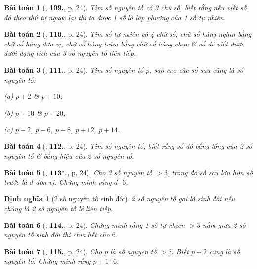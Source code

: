 \documentclass[oneside]{book}
\numberwithin{equation}{section}
\newtheorem{dinhnghia}{Định nghĩa}[section]
\newtheorem{baitoan}{Bài toán}[section]
\begin{document}
\begin{baitoan}[\cite{Binh_Toan_6_tap_1}, \textbf{109.}, p. 24]
	Tìm số nguyên tố có 3 chữ số, biết rằng nếu viết số đó theo thứ tự ngược lại thì ta được 1 số là lập phương của 1 số tự nhiên.
\end{baitoan}

\begin{baitoan}[\cite{Binh_Toan_6_tap_1}, \textbf{110.}, p. 24]
	Tìm số tự nhiên có 4 chữ số, chữ số hàng nghìn bằng chữ số hàng đơn vị, chữ số hàng trăm bằng chữ số hàng chục \& số đó viết được dưới dạng tích của 3 số nguyên tố liên tiếp.
\end{baitoan}

\begin{baitoan}[\cite{Binh_Toan_6_tap_1}, \textbf{111.}, p. 24]
	Tìm số nguyên tố $p$, sao cho các số sau cũng là số nguyên tố:
	\begin{enumerate*}
		\item[(a)] $p + 2$ \& $p + 10$;
		\item[(b)] $p + 10$ \& $p + 20$;
		\item[(c)] $p + 2$, $p + 6$, $p + 8$, $p + 12$, $p + 14$.
	\end{enumerate*}
\end{baitoan}

\begin{baitoan}[\cite{Binh_Toan_6_tap_1}, \textbf{112.}, p. 24]
	Tìm số nguyên tố, biết rằng số đó bằng tổng của 2 số nguyên tố \& bằng hiệu của 2 số nguyên tố.
\end{baitoan}

\begin{baitoan}[\cite{Binh_Toan_6_tap_1}, $\bf 113^\star.$, p. 24]
	Cho 3 số nguyên tố $> 3$, trong đó số sau lớn hơn số trước là $d$ đơn vị. Chứng minh rằng $d\ \vdots\ 6$.
\end{baitoan}

\begin{dinhnghia}[2 số nguyên tố sinh đôi]
	2 số nguyên tố gọi là \emph{sinh đôi} nếu chúng là 2 số nguyên tố lẻ liên tiếp.
\end{dinhnghia}

\begin{baitoan}[\cite{Binh_Toan_6_tap_1}, \textbf{114.}, p. 24]
	Chứng minh rằng 1 số tự nhiên $> 3$ nằm giữa 2 số nguyên tố sinh đôi thì chia hết cho $6$.
\end{baitoan}

\begin{baitoan}[\cite{Binh_Toan_6_tap_1}, \textbf{115.}, p. 24]
	Cho $p$ là số nguyên tố $> 3$. Biết $p + 2$ cũng là số nguyên tố. Chứng minh rằng $p + 1\ \vdots\ 6$.
\end{baitoan}
\end{document}
